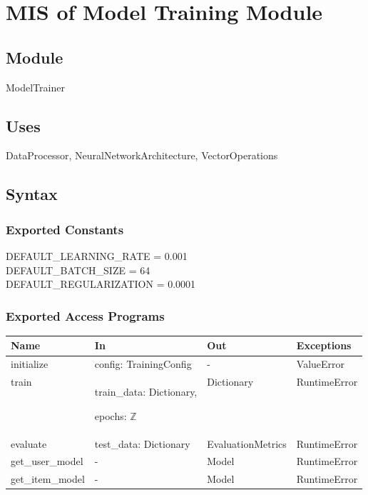 \documentclass[12pt, titlepage]{article}
\begin{document}
\newpage

\section{MIS of Model Training Module} \label{ModuleMT}

\subsection{Module}

ModelTrainer

\subsection{Uses}
DataProcessor, NeuralNetworkArchitecture, VectorOperations

\subsection{Syntax}

\subsubsection{Exported Constants}
DEFAULT\_LEARNING\_RATE = 0.001\\
DEFAULT\_BATCH\_SIZE = 64\\
DEFAULT\_REGULARIZATION = 0.0001
\subsubsection{Exported Access Programs}

\begin{center}
  \begin{tabular}{p{3cm} p{5cm} p{4cm} p{2cm}}
  \hline
  \textbf{Name} & \textbf{In} & \textbf{Out} & \textbf{Exceptions} \\
  \hline
  initialize & config: TrainingConfig & - & ValueError \\
  \hline
  train & train\_data: Dictionary,
  
  epochs: $\mathbb{Z}$
  
  & Dictionary & RuntimeError \\
  \hline
  evaluate & test\_data: Dictionary
  
  & EvaluationMetrics & RuntimeError \\
  \hline
  get\_user\_model & 
  
  - &  Model & RuntimeError \\
  \hline
  get\_item\_model & 
  
  - &  Model & RuntimeError \\
  \hline
  \end{tabular}
  \end{center}
\end{document}
